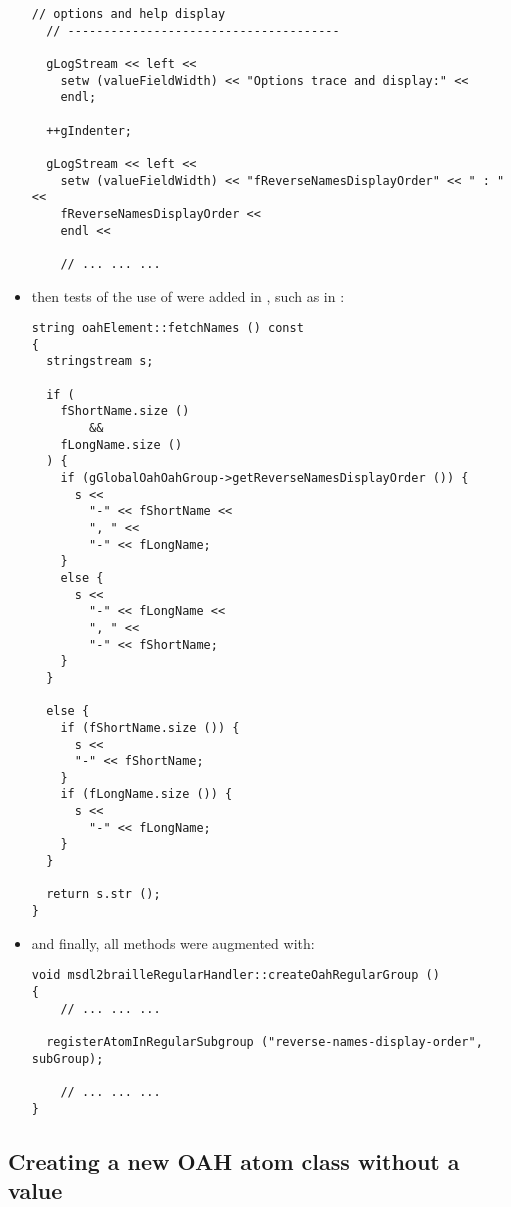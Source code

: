 \begin{itemize}
\begin{lstlisting}[language=CPlusPlus]
  // options and help display
  // --------------------------------------

  gLogStream << left <<
    setw (valueFieldWidth) << "Options trace and display:" <<
    endl;

  ++gIndenter;

  gLogStream << left <<
    setw (valueFieldWidth) << "fReverseNamesDisplayOrder" << " : " <<
    fReverseNamesDisplayOrder <<
    endl <<

	// ... ... ...
\end{lstlisting}

\item then tests of the use of  were added in , such as in :
\begin{lstlisting}[language=CPlusPlus]
string oahElement::fetchNames () const
{
  stringstream s;

  if (
    fShortName.size ()
        &&
    fLongName.size ()
  ) {
    if (gGlobalOahOahGroup->getReverseNamesDisplayOrder ()) {
      s <<
        "-" << fShortName <<
        ", " <<
        "-" << fLongName;
    }
    else {
      s <<
        "-" << fLongName <<
        ", " <<
        "-" << fShortName;
    }
  }

  else {
    if (fShortName.size ()) {
      s <<
      "-" << fShortName;
    }
    if (fLongName.size ()) {
      s <<
        "-" << fLongName;
    }
  }

  return s.str ();
}
\end{lstlisting}

\item and finally, all  methods were augmented with:
\begin{lstlisting}[language=CPlusPlus]
 void msdl2brailleRegularHandler::createOahRegularGroup ()
{
	// ... ... ...

  registerAtomInRegularSubgroup ("reverse-names-display-order", subGroup);

	// ... ... ...
}
\end{lstlisting}

\end{itemize}


\subsection{Creating a new OAH atom class without a value}

